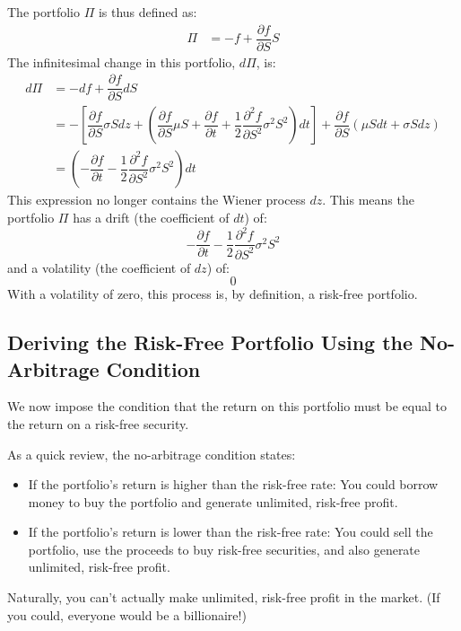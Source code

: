 \documentclass[uplatex]{jsarticle}
\begin{document}
The portfolio $\Pi$ is thus defined as:
\begin{align}
	\Pi & = - f + \dfrac{\partial f}{\partial S} S
\end{align}
The infinitesimal change in this portfolio, $d \Pi$, is:
\begin{align}
	d \Pi & = - df + \dfrac{\partial f}{\partial S} dS                                                                                                                                                                                                                                               \\
	      & = - \left[ \dfrac{\partial f}{\partial S} \sigma S dz + \left( \dfrac{\partial f}{\partial S} \mu S + \dfrac{\partial f}{\partial t} + \dfrac{1}{2} \dfrac{\partial^{2} f}{\partial S^{2}} \sigma^{2} S^{2} \right) dt \right] + \dfrac{\partial f}{\partial S} (\mu S dt + \sigma S dz) \\
	      & = \left( - \dfrac{\partial f}{\partial t} - \dfrac{1}{2} \dfrac{\partial^{2} f}{\partial S^{2}} \sigma^{2} S^{2} \right) dt
\end{align}
This expression no longer contains the Wiener process $dz$. This means the portfolio $\Pi$ has a drift (the coefficient of $dt$) of:
$$
	- \dfrac{\partial f}{\partial t} - \dfrac{1}{2} \dfrac{\partial^{2} f}{\partial S^{2}} \sigma^{2} S^{2}
$$
and a volatility (the coefficient of $dz$) of:
$$
	0
$$
With a volatility of zero, this process is, by definition, a risk-free portfolio.

\subsection{Deriving the Risk-Free Portfolio Using the No-Arbitrage Condition}

We now impose the condition that the return on this portfolio must be equal to the return on a risk-free security.

As a quick review, the no-arbitrage condition states:
\begin{itemize}
	\item If the portfolio's return is higher than the risk-free rate: You could borrow money to buy the portfolio and generate unlimited, risk-free profit.
	\item If the portfolio's return is lower than the risk-free rate: You could sell the portfolio, use the proceeds to buy risk-free securities, and also generate unlimited, risk-free profit.
\end{itemize}
Naturally, you can't actually make unlimited, risk-free profit in the market. (If you could, everyone would be a billionaire!)
\end{document}

